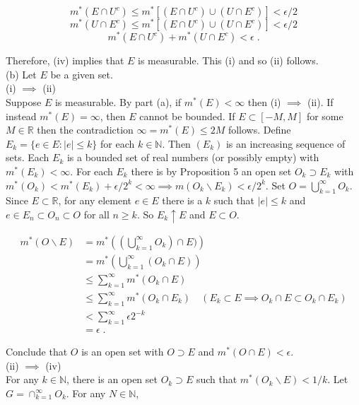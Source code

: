 \documentclass[a4paper]{article}
\begin{document}
$$m^*(E \cap U^c) \leq m^*\left[(E\cap U^c)\cup (U \cap E^c)\right] < \epsilon /2 $$ 
$$m^*(U \cap E^c) \leq  m^*\left[(E\cap U^c)\cup (U \cap E^c)\right] < \epsilon /2 $$ 
$$m^*(E \cap U^c) + m^*(U\cap E^c) < \epsilon \;. $$

Therefore, (iv) implies that $E$ is measurable. This (i) and so (ii) follows. \\

(b) Let $E$ be a given set.\\

(i) $\implies$ (ii)\\
Suppose $E$ is measurable. By part (a), if $m^*(E) < \infty$ then (i) $\implies$ (ii). If instead $m^*(E) = \infty$, then $E$ cannot be bounded. If $E \subset [-M,M]$ for some $M \in \mathbb{R}$ then the contradiction $\infty = m^*(E) \leq 2M$ follows. Define $E_k = \{e \in E : |e| \leq k\}$ for each $k \in \mathbb{N}$. Then $(E_k)$ is an increasing sequence of sets. Each $E_k$ is a bounded set of real numbers (or possibly empty) with $m^*(E_k) < \infty$. For each $E_k$ there is by Proposition 5 an open set $O_k \supset E_k$ with $m^*(O_k) < m^*(E_k) + \epsilon/2^k < \infty \implies m(O_k \backslash E_k) < \epsilon /2^k$. Set $O = \bigcup_{k=1}^\infty O_k$. Since $E\subset \mathbb{R}$, for any element $e \in E$ there is a $k$ such that $|e| \leq k$ and $e \in E_n\subset O_n \subset O$ for all $n \geq k$. So $E_k \uparrow E$ and $E \subset O$. 

\begin{align*}
m^*(O \backslash E) &= m^*\left((\bigcup_{k=1}^\infty O_k) \cap E)\right) \\
&= m^*\left(\bigcup_{k=1}^\infty (O_k \cap E) \right)\\
&\leq \sum_{k=1}^\infty m^*(O_k \cap E) \\
&\leq \sum_{k=1}^\infty m^*(O_k \cap E_k) \quad (E_k \subset E \implies O_k \cap E \subset O_k \cap E_k)\\
&< \sum_{k=1}^\infty \epsilon 2^{-k} \\
& = \epsilon \; .
\end{align*}

Conclude that $O$ is an open set with $O \supset E$ and $m^*(O \cap E) < \epsilon$. \\

(ii) $\implies$ (iv)\\
For any $k \in \mathbb{N}$, there is an open set $O_k \supset E$ such that $m^*(O_k \backslash E) < 1/k$. Let $G = \cap_{k=1}^\infty O_k$. For any $N \in \mathbb{N}$,
\end{document}
